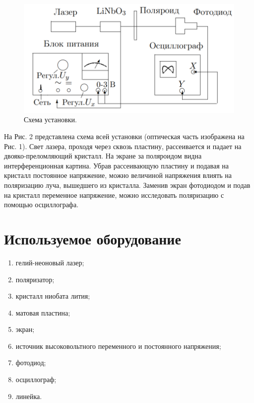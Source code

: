 \documentclass[a4paper, 12pt]{article}
\begin{document}
\begin{figure}[H]
\begin{center}
    \includegraphics[scale=0.7]{2.png}
\end{center}
\caption{Схема установки.}
\label{fig:scheme}
\end{figure}

На Рис. 2 представлена схема всей установки (оптическая часть изображена на Рис. 1). Свет лазера, проходя через сквозь пластину, рассеивается и падает на двояко-преломляющий кристалл. На экране за поляроидом видна интерференционная картина. Убрав рассеивающую пластину и подавая на кристалл постоянное напряжение, можно величиной напряжения влиять на поляризацию луча, вышедшего из кристалла. Заменив экран фотодиодом и подав на кристалл переменное напряжение, можно исследовать поляризацию с помощью осциллографа.
	
\newpage

\section{Используемое оборудование}

\begin{enumerate}
    \item гелий-неоновый лазер;
    \item поляризатор;
    \item кристалл ниобата лития;
    \item матовая пластина;
    \item экран;
    \item источник высоковольтного переменного и постоянного напряжения;
    \item фотодиод;
    \item осциллограф;
    \item линейка.
\end{enumerate}
\end{document}
